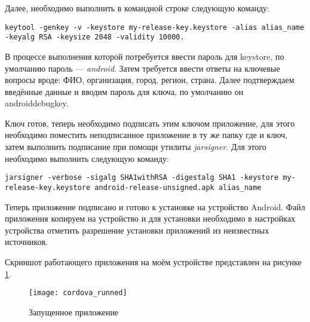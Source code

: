 Далее, необходимо выполнить в командной строке следующую команду: 
\begin{lstlisting}
keytool -genkey -v -keystore my-release-key.keystore -alias alias_name -keyalg RSA -keysize 2048 -validity 10000.
\end{lstlisting}
В процессе выполнения которой потребуется ввести пароль для keystore, по умолчанию пароль --- \textit{android}. Затем требуется ввести ответы на ключевые вопросы вроде: ФИО, организация, город, регион, страна. Далее подтверждаем введённые данные и вводим пароль для ключа, по умолчанию он androiddebugkey\cite{android:publish}.

Ключ готов, теперь необходимо подписать этим ключом приложение, для этого необходимо поместить неподписанное приложение в ту же папку где и ключ, затем выполнить подписание при помощи утилиты \textit{jarsigner}. Для этого необходимо выполнить следующую команду: 
\begin{lstlisting}
jarsigner -verbose -sigalg SHA1withRSA -digestalg SHA1 -keystore my-release-key.keystore android-release-unsigned.apk alias_name
\end{lstlisting}

Теперь приложение подписано и готово к установке на устройство Android. Файл приложения копируем на устройство и для установки необходимо в настройках устройства отметить разрешение установки приложений из неизвестных источников.

Скриншот работающего приложения на моём устройстве представлен на рисунке \ref{cordova_runned}.
\begin{figure}[ht]
\center\texttt{[image: cordova\_runned]}
\caption{Запущенное приложение}\label{cordova_runned}
\end{figure}